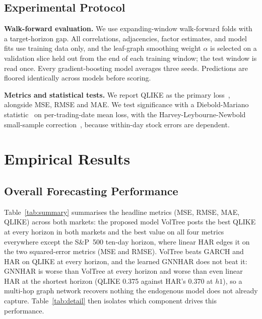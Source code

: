 \documentclass[runningheads]{llncs}
\begin{document}
\subsection{Experimental Protocol}
\textbf{Walk-forward evaluation.} We use expanding-window walk-forward folds with a target-horizon gap. All
correlations, adjacencies, factor estimates, and model fits use training data only, and the leaf-graph
smoothing weight $\alpha$ is selected on a validation slice held out from the end of each training window;
the test window is read once. Every gradient-boosting model averages three seeds. Predictions are floored identically
across models before scoring.

\textbf{Metrics and statistical tests.} We report QLIKE as the primary loss~\cite{patton2011}, alongside
MSE, RMSE and MAE. We test significance with a Diebold-Mariano statistic~\cite{dm1995} on per-trading-date
mean loss, with the Harvey-Leybourne-Newbold small-sample correction~\cite{hln1997}, because within-day
stock errors are dependent.

\FloatBarrier

\section{Empirical Results}

\subsection{Overall Forecasting Performance}
Table~\ref{tab:summary} summarises the headline metrics (MSE, RMSE, MAE, QLIKE) across both markets: the proposed model VolTree posts the best QLIKE at every horizon in both markets and the best value on all four metrics everywhere except the S\&P~500 ten-day horizon, where linear HAR edges it on the two squared-error metrics (MSE and RMSE). VolTree beats GARCH and HAR on QLIKE at every horizon, and the learned GNNHAR does not beat it: GNNHAR is worse than VolTree at every horizon and worse than even linear HAR at the shortest horizon (QLIKE 0.375 against HAR's 0.370 at $h1$), so a multi-hop graph network recovers nothing the endogenous model does not already capture. Table~\ref{tab:detail} then isolates which component drives this performance.
\end{document}
